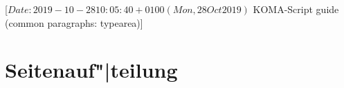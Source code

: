 %
%
%
%
%
%
%
%
% 
%
%
%
%

                 [$Date: 2019-10-28 10:05:40 +0100 (Mon, 28 Oct 2019) $
                  KOMA-Script guide (common paragraphs: typearea)]


\section{\texorpdfstring{Seitenauf"|teilung}{Seitenaufteilung}}
\BeginIndexGroup
{}

